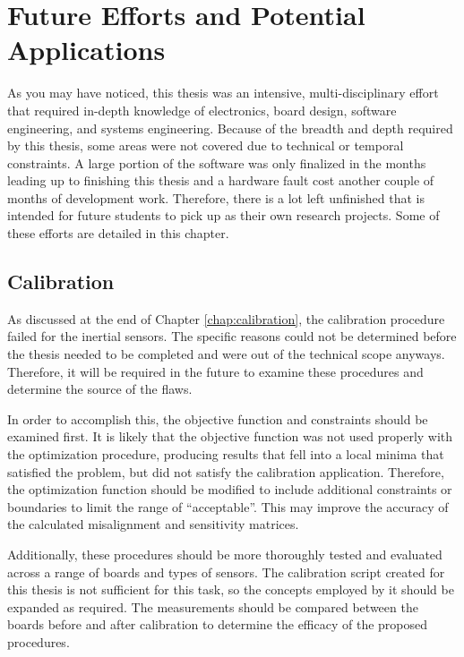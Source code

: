 \chapter{Future Efforts and Potential Applications} 
As you may have noticed, this thesis was an intensive, multi-disciplinary effort that required in-depth knowledge of electronics, board design, software engineering, and systems engineering.
Because of the breadth and depth required by this thesis, some areas were not covered due to technical or temporal constraints.
A large portion of the software was only finalized in the months leading up to finishing this thesis and a hardware fault cost another couple of months of development work.
Therefore, there is a lot left unfinished that is intended for future students to pick up as their own research projects.
Some of these efforts are detailed in this chapter.

\section{Calibration} 
As discussed at the end of Chapter \ref{chap:calibration}, the calibration procedure failed for the inertial sensors.
The specific reasons could not be determined before the thesis needed to be completed and were out of the technical scope anyways.
Therefore, it will be required in the future to examine these procedures and determine the source of the flaws.

In order to accomplish this, the objective function and constraints should be examined first.
It is likely that the objective function was not used properly with the optimization procedure, producing results that fell into a local minima that satisfied the problem, but did not satisfy the calibration application.
Therefore, the optimization function should be modified to include additional constraints or boundaries to limit the range of ``acceptable''.
This may improve the accuracy of the calculated misalignment and sensitivity matrices.

Additionally, these procedures should be more thoroughly tested and evaluated across a range of boards and types of sensors.
The calibration script \cite{Thetis-Scripts} created for this thesis is not sufficient for this task, so the concepts employed by it should be expanded as required.
The measurements should be compared between the boards before and after calibration to determine the efficacy of the proposed procedures.

